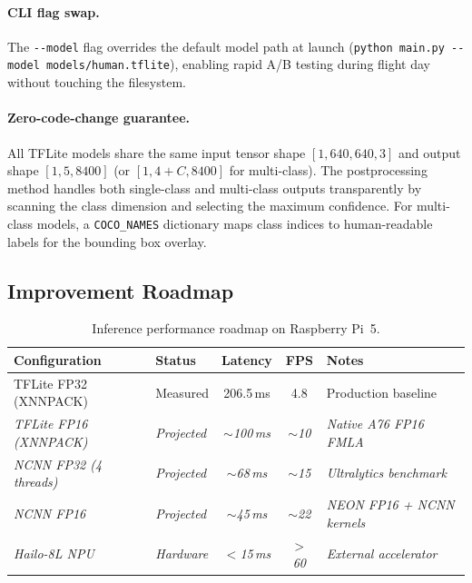 \documentclass[10pt,a4paper]{article}
\begin{document}
\paragraph{CLI flag swap.} The \texttt{-{}-model} flag overrides the default model path at launch (\texttt{python main.py -{}-model models/human.tflite}), enabling rapid A/B testing during flight day without touching the filesystem.

\paragraph{Zero-code-change guarantee.} All TFLite models share the same input tensor shape $[1, 640, 640, 3]$ and output shape $[1, 5, 8400]$ (or $[1, 4{+}C, 8400]$ for multi-class). The postprocessing method handles both single-class and multi-class outputs transparently by scanning the class dimension and selecting the maximum confidence. For multi-class models, a \texttt{COCO\_NAMES} dictionary maps class indices to human-readable labels for the bounding box overlay.

\subsection{Improvement Roadmap}

\begin{table}[ht]
  \centering
  \caption{Inference performance roadmap on Raspberry Pi~5.}\label{tab:inference-roadmap}
  \begin{tabular}{@{}l l c c l@{}}
    \toprule
    \textbf{Configuration} & \textbf{Status} & \textbf{Latency} & \textbf{FPS} & \textbf{Notes} \\
    \midrule
    TFLite FP32 (XNNPACK)    & Measured  & 206.5\,ms & 4.8  & Production baseline \\
    \textit{TFLite FP16 (XNNPACK)}    & \textit{Projected} & \textit{${\sim}$100\,ms}  & \textit{${\sim}$10}   & \textit{Native A76 FP16 FMLA} \\
    \textit{NCNN FP32 (4 threads)}    & \textit{Projected} & \textit{${\sim}$68\,ms}   & \textit{${\sim}$15}   & \textit{Ultralytics benchmark} \\
    \textit{NCNN FP16}                & \textit{Projected} & \textit{${\sim}$45\,ms}   & \textit{${\sim}$22}   & \textit{NEON FP16 + NCNN kernels} \\
    \textit{Hailo-8L NPU}             & \textit{Hardware}  & \textit{$<$15\,ms} & \textit{$>$60}   & \textit{External accelerator} \\
    \bottomrule
  \end{tabular}
\end{table}
\end{document}
